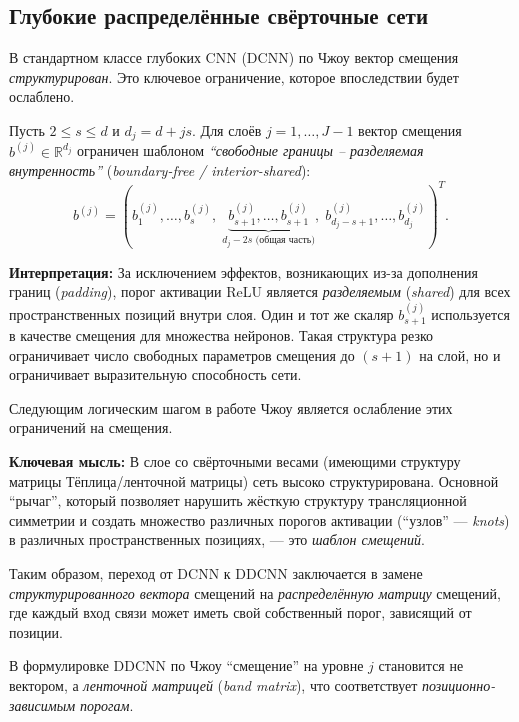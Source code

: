 \documentclass[../NDCNNAI_main.tex]{subfiles}
\begin{document}
\subsection{Глубокие распределённые свёрточные сети}
В стандартном классе глубоких CNN (DCNN) по Чжоу \cite{Zhou2018} вектор смещения \emph{структурирован}. Это ключевое ограничение, которое впоследствии будет ослаблено.

\begin{definition}
Пусть $2 \leq s \leq d$ и $d_j = d + j s$. Для слоёв $j = 1, \ldots, J-1$ вектор смещения $b^{(j)} \in \mathbb{R}^{d_j}$ ограничен шаблоном \emph{``свободные границы -- разделяемая внутренность''} (\emph{boundary-free / interior-shared}):
\[
b^{(j)} = \left( b_1^{(j)}, \ldots, b_s^{(j)},\;
\underbrace{b_{s+1}^{(j)}, \ldots, b_{s+1}^{(j)}}_{d_j - 2s \text{ (общая часть)}},\;
b_{d_j - s+1}^{(j)}, \ldots, b_{d_j}^{(j)} \right)^T.
\]
\end{definition}

\textbf{Интерпретация:} За исключением эффектов, возникающих из-за дополнения границ (\emph{padding}), порог активации ReLU является \emph{разделяемым} (\emph{shared}) для всех пространственных позиций внутри слоя. Один и тот же скаляр $b_{s+1}^{(j)}$ используется в качестве смещения для множества нейронов. Такая структура резко ограничивает число свободных параметров смещения до $(s+1)$ на слой, но и ограничивает выразительную способность сети.

Следующим логическим шагом в работе Чжоу \cite{Zhou_Distributed} является ослабление этих ограничений на смещения.

\textbf{Ключевая мысль:} В слое со свёрточными весами (имеющими структуру матрицы Тёплица/ленточной матрицы) сеть высоко структурирована. Основной ``рычаг'', который позволяет нарушить жёсткую структуру трансляционной симметрии и создать множество различных порогов активации (``узлов'' --- \emph{knots}) в различных пространственных позициях, --- это \emph{шаблон смещений}.

Таким образом, переход от DCNN к DDCNN заключается в замене \emph{структурированного вектора} смещений на \emph{распределённую матрицу} смещений, где каждый вход связи может иметь свой собственный порог, зависящий от позиции.

В формулировке DDCNN по Чжоу \cite{Zhou_Distributed} ``смещение'' на уровне $j$ становится не вектором, а \emph{ленточной матрицей} (\emph{band matrix}), что соответствует \emph{позиционно-зависимым порогам}.
\end{document}
